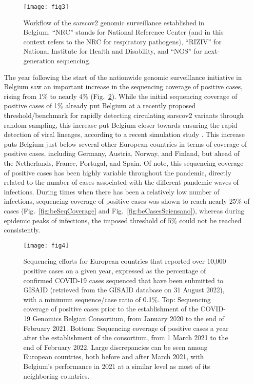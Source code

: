 \begin{figure}[ht]
  \centering
  \texttt{[image: fig3]}
  \caption[Genomic surveillance pipeline]{Workflow of the \gls{sarscov2} genomic surveillance established in Belgium. ``NRC'' stands for National Reference Center (and in this context refers to the NRC for respiratory pathogens), ``RIZIV'' for National Institute for Health and Disability, and ``NGS'' for next-generation sequencing.}
  \label{fig:bePipeline}
\end{figure} 

The year following the start of the nationwide genomic surveillance initiative in Belgium saw an important increase in the sequencing coverage of positive cases, rising from 1\% to nearly 4\% (Fig.~\ref{fig:euGenomeCounts}).
While the initial sequencing coverage of positive cases of 1\% already put Belgium at a recently proposed threshold/benchmark for rapidly detecting circulating \gls{sarscov2} variants through random sampling, this increase put Belgium closer towards ensuring the rapid detection of viral lineages, according to a recent simulation study \citep{brito2022global}.
This increase puts Belgium just below several other European countries in terms of coverage of positive cases, including Germany, Austria, Norway, and Finland, but ahead of the Netherlands, France, Portugal, and Spain.
Of note, this sequencing coverage of positive cases has been highly variable throughout the pandemic, directly related to the number of cases associated with the different pandemic waves of infections.
During times when there has been a relatively low number of infections, sequencing coverage of positive cases was shown to reach nearly 25\% of cases (Fig.~\ref{fig:beSeqCoverage} and Fig.~\ref{fig:beCasesSciensano}), whereas during epidemic peaks of infections, the imposed threshold of 5\% could not be reached consistently.

\begin{figure}[ht]
  \centering
  \texttt{[image: fig4]}
  \caption[European sequencing coverage 2020--2022]{Sequencing efforts for European countries that reported over 10,000 positive cases on a given year, expressed as the percentage of confirmed COVID-19 cases sequenced that have been submitted to GISAID (retrieved from the GISAID database on 31 August 2022), with a minimum sequence/case ratio of 0.1\%. Top: Sequencing coverage of positive cases prior to the establishment of the COVID-19 Genomics Belgian Consortium, from January 2020 to the end of February 2021. Bottom: Sequencing coverage of positive cases a year after the establishment of the consortium, from 1 March 2021 to the end of February 2022. Large discrepancies can be seen among European countries, both before and after March 2021, with Belgium's performance in 2021 at a similar level as most of its neighboring countries.}
  \label{fig:euGenomeCounts}
\end{figure}

